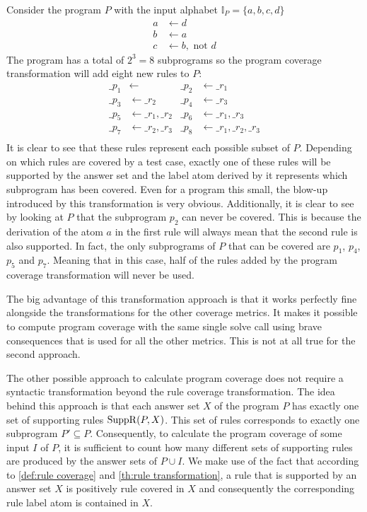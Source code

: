\begin{example}
\label{ex:program transformation}
    Consider the program $P$ with the input alphabet \(\mathbb{I}_P = \{a, b, c, d\}\)
    \begin{align*}
        a &\leftarrow d \\
        b &\leftarrow a \\
        c &\leftarrow b, \text{ not } d
    \end{align*}
    The program has a total of \(2^3 = 8\) subprograms so the program coverage transformation will add eight new rules to $P$:
    \begin{align*}
        \_p_1 &\leftarrow              &   \_p_2 &\leftarrow \_r_1 \\
        \_p_3 &\leftarrow \_r_2        &   \_p_4 &\leftarrow \_r_3 \\
        \_p_5 &\leftarrow \_r_1, \_r_2 &   \_p_6 &\leftarrow \_r_1, \_r_3 \\
        \_p_7 &\leftarrow \_r_2, \_r_3 &   \_p_8 &\leftarrow \_r_1, \_r_2, \_r_3 \\
    \end{align*}
    It is clear to see that these rules represent each possible subset of $P$. Depending on which rules are covered by a test case, exactly one of these rules will be supported by the answer set and the label atom derived by it represents which subprogram has been covered. Even for a program this small, the blow-up introduced by this transformation is very obvious. Additionally, it is clear to see by looking at $P$ that the subprogram $p_2$ can never be covered. This is because the derivation of the atom $a$ in the first rule will always mean that the second rule is also supported. In fact, the only subprograms of $P$ that can be covered are $p_1$, $p_4$, $p_5$ and $p_7$. Meaning that in this case, half of the rules added by the program coverage transformation will never be used.
\end{example}

The big advantage of this transformation approach is that it works perfectly fine alongside the transformations for the other coverage metrics. It makes it possible to compute program coverage with the same single solve call using brave consequences that is used for all the other metrics. This is not at all true for the second approach.

The other possible approach to calculate program coverage does not require a syntactic transformation beyond the rule coverage transformation. The idea behind this approach is that each answer set $X$ of the program $P$ has exactly one set of supporting rules \(\operatorname{SuppR}(P, X)\). This set of rules corresponds to exactly one subprogram \(P' \subseteq P\). Consequently, to calculate the program coverage of some input $I$ of $P$, it is sufficient to count how many different sets of supporting rules are produced by the answer sets of $P \cup I$. We make use of the fact that according to \cref{def:rule coverage} and \cref{th:rule transformation}, a rule that is supported by an answer set $X$ is positively rule covered in $X$ and consequently the corresponding rule label atom is contained in $X$.

